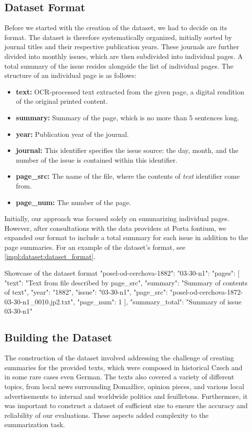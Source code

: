 \documentclass[english, ba, kiv, he, iso690numb, pdf, viewonly]{fasthesis}
\begin{document}
\subsection{Dataset Format}
Before we started with the creation of the dataset, we had to decide on its format.
The dataset is therefore systematically organized, initially sorted by journal titles and their respective publication years. These journals are further divided into monthly issues, which are then subdivided into individual pages. A total summary of the issue resides alongside the list of individual pages. The structure of an individual page is as follows:
\begin{itemize}
    \item \textbf{text:} OCR-processed text extracted from the given page, a digital rendition of the original printed content.
    \item \textbf{summary:} Summary of the page, which is no more than 5 sentences long.
    \item \textbf{year:} Publication year of the journal.
    \item \textbf{journal:} This identifier specifies the issue source: the day, month, and the number of the issue is contained within this identifier.
    \item \textbf{page\_src:} The name of the file, where the contents of \textit{text} identifier come from.
    \item \textbf{page\_num:} The number of the page.
\end{itemize}
Initially, our approach was focused solely on summarizing individual pages. However, after consultations with the data providers at Porta fontium, we expanded our format to include a total summary for each issue in addition to the page summaries. For an example of the dataset's format, see \ref{impl:dataset:dataset_format}. 
\begin{code}{}{Showcase of the dataset format\label{impl:dataset:dataset_format}}
{
  "posel-od-cerchova-1882": {
    "03-30-n1": {
      "pages": [
        {
          "text": "Text from file described by page_src",
          "summary": "Summary of contents of text",
          "year": "1882",
          "issue": "03-30-n1",
          "page_src": "posel-od-cerchova-1872-03-30-n1_0010.jp2.txt",
          "page_num": 1
        }
      ],
      "summary_total": "Summary of issue 03-30-n1"
    }
  }
}
\end{code}
\subsection{Building the Dataset}
The construction of the dataset involved addressing the challenge of creating summaries for the provided texts, which were composed in historical Czech and in some rare cases even German. The texts also covered a variety of different topics, from local news surrounding Domažlice, opinion pieces, and various local advertisements to internal and worldwide politics and feuilletons. Furthermore, it was important to construct a dataset of sufficient size to ensure the accuracy and reliability of our evaluations. These aspects added complexity to the summarization task.
\end{document}
